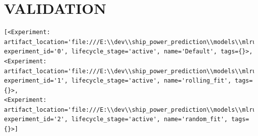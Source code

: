 \section*{VALIDATION}\label{validation}
\begin{verbatim}
[<Experiment: artifact_location='file:///E:\\dev\\ship_power_prediction\\models\\mlruns/0', experiment_id='0', lifecycle_stage='active', name='Default', tags={}>,
<Experiment: artifact_location='file:///E:\\dev\\ship_power_prediction\\models\\mlruns/1', experiment_id='1', lifecycle_stage='active', name='rolling_fit', tags={}>,
<Experiment: artifact_location='file:///E:\\dev\\ship_power_prediction\\models\\mlruns/2', experiment_id='2', lifecycle_stage='active', name='random_fit', tags={}>]
\end{verbatim}
